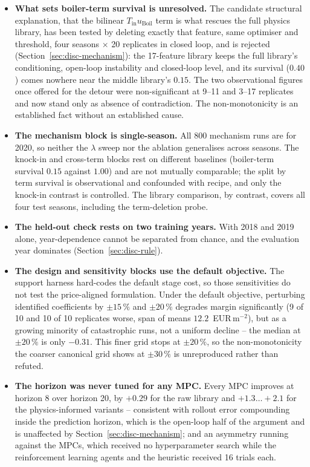 \begin{itemize}
\item \textbf{What sets boiler-term survival is unresolved.} The candidate
structural explanation, that the bilinear $T_{\text{in}}u_{\text{Boil}}$ term is what rescues the full physics library, has been tested by deleting exactly that
feature, same optimiser and threshold, four seasons $\times$ 20 replicates in
closed loop, and is rejected (Section~\ref{sec:disc-mechanism}): the 17-feature
library keeps the full library's conditioning, open-loop instability and
closed-loop level, and its survival ($0.40$) comes nowhere near the middle
library's $0.15$. The two observational figures once offered for the detour were
non-significant at 9--11 and 3--17 replicates and now stand only as absence of
contradiction. The non-monotonicity is an established fact without an established
cause.

\item \textbf{The mechanism block is single-season.} All 800 mechanism runs are
for 2020, so neither the $\lambda$ sweep nor the ablation generalises across
seasons. The knock-in and cross-term blocks rest on different baselines
(boiler-term survival $0.15$ against $1.00$) and are not mutually comparable;
the split by term survival is observational and confounded with recipe, and only
the knock-in contrast is controlled. The library comparison, by contrast,
covers all four test seasons, including the term-deletion probe.

\item \textbf{The held-out check rests on two training years.} With 2018 and
2019 alone, year-dependence cannot be separated from chance, and the evaluation
year dominates (Section~\ref{sec:disc-rule}).

\item \textbf{The design and sensitivity blocks use the default objective.} The support
harness hard-codes the default stage cost, so those sensitivities do not test the
price-aligned formulation. Under the default objective, perturbing identified coefficients
by $\pm15\,\%$ and $\pm20\,\%$
degrades margin significantly (9 of 10 and 10 of 10 replicates worse, span of
means $12.2$~EUR\,m$^{-2}$), but as a growing minority of catastrophic runs, not
a uniform decline -- the median at $\pm20\,\%$ is only $-0.31$. This finer grid
stops at $\pm20\,\%$, so the non-monotonicity the coarser canonical grid shows
at $\pm30\,\%$ is unreproduced rather than refuted.

\item \textbf{The horizon was never tuned for any MPC.} Every MPC improves at
horizon 8 over horizon 20, by $+0.29$ for the raw library and
$+1.3\ldots+2.1$ for the physics-informed variants -- consistent with rollout error
compounding inside the prediction horizon, which is the open-loop half of the
argument and is unaffected by Section~\ref{sec:disc-mechanism}; and an asymmetry
running against the MPCs, which
received no hyperparameter search while the reinforcement learning agents and
the heuristic received 16 trials each.


\end{itemize}
